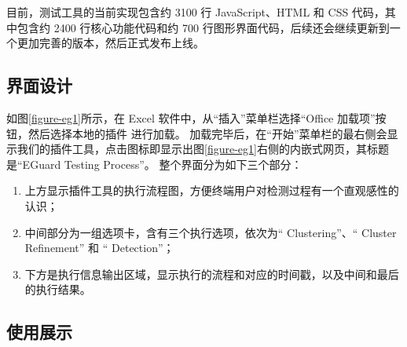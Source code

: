 目前，\eg 测试工具的当前实现包含约 3100 行 JavaScript、HTML 和 CSS 代码，其中包含约 2400 行核心功能代码和约 700 行图形界面代码，后续还会继续更新到一个更加完善的版本，然后正式发布上线。






\subsection{界面设计}

如图\ref{figure-eg1}所示，在 Excel 软件中，从“插入”菜单栏选择“Office 加载项”按钮，然后选择本地的插件 \eg 进行加载。
加载完毕后，在“开始”菜单栏的最右侧会显示我们的插件工具，点击图标即显示出图\ref{figure-eg1}右侧的内嵌式网页，其标题是“EGuard Testing Process”。
整个界面分为如下三个部分：
\begin{enumerate}
    \item 上方显示\eg 插件工具的执行流程图，方便终端用户对检测过程有一个直观感性的认识；
    \item 中间部分为一组选项卡，含有三个执行选项，依次为“ Clustering”、“ Cluster Refinement” 和 “ Detection”；
    \item 下方是执行信息输出区域，显示执行的流程和对应的时间戳，以及中间和最后的执行结果。
\end{enumerate}


\subsection{使用展示}

